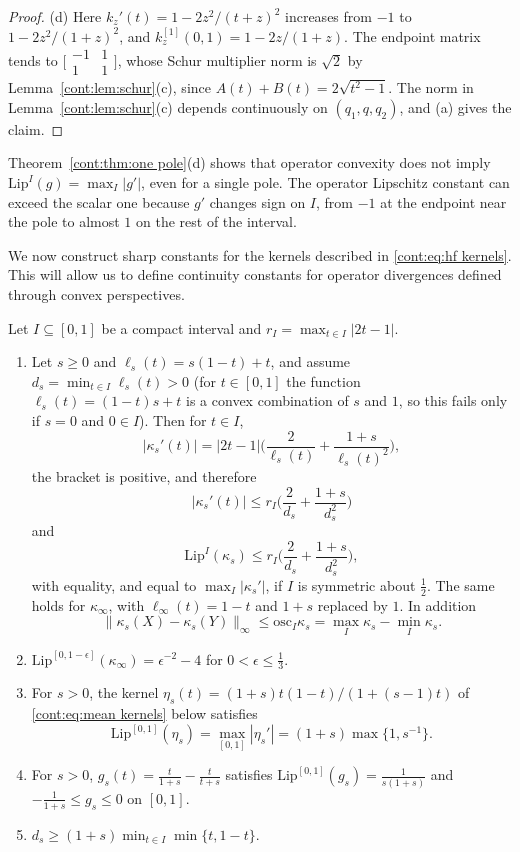 \begin{proof}
(d) Here $k_z'(t)=1-2z^2/(t+z)^2$ increases from $-1$ to $1-2z^2/(1+z)^2$, and $k_z^{[1]}(0,1)=1-2z/(1+z)$. The endpoint matrix tends to $\big[\begin{smallmatrix}-1&1\\1&1\end{smallmatrix}\big]$, whose Schur multiplier norm is $\sqrt2$ by Lemma~\ref{cont:lem:schur}(c), since $A(t)+B(t)=2\sqrt{t^2-1}$. The norm in Lemma~\ref{cont:lem:schur}(c) depends continuously on $(q_1,q,q_2)$, and (a) gives the claim.
\end{proof}
 
Theorem~\ref{cont:thm:one pole}(d) shows that operator convexity does not imply $\mathrm{Lip}^I(g)=\max_I|g'|$, even for a single pole. The operator Lipschitz constant can exceed the scalar one because $g'$ changes sign on $I$, from $-1$ at the endpoint near the pole to almost $1$ on the rest of the interval.

We now construct sharp constants for the kernels described in \eqref{cont:eq:hf kernels}. This will allow us to define continuity constants for operator divergences defined through convex perspectives. 
\begin{corollary}\label{cont:cor:kernels}
Let $I\subseteq[0,1]$ be a compact interval and $r_I=\max_{t\in I}|2t-1|$.
\begin{enumerate}
\item[(a)]
Let $s\ge0$ and $\ell_s(t)=s(1-t)+t$, and assume $d_s=\min_{t\in I}\ell_s(t)>0$
(for $t\in[0,1]$ the function $\ell_s(t)=(1-t)s+t$ is a convex combination of $s$ and $1$,
so this fails only if $s=0$ and $0\in I$). Then for $t\in I$,
\[
  |\kappa_s'(t)|=|2t-1|\Big(\frac{2}{\ell_s(t)}+\frac{1+s}{\ell_s(t)^2}\Big),
\]
the bracket is positive, and therefore
\[
  |\kappa_s'(t)|
  \leq r_I\Big(\frac{2}{d_s}+\frac{1+s}{d_s^2}\Big)
\] and
\[
\mathrm{Lip}^I(\kappa_s)\leq r_I\Big(\frac{2}{d_s}+\frac{1+s}{d_s^2}\Big),
\]
with equality, and equal to $\max_I|\kappa_s'|$, if $I$ is symmetric about $\frac12$. The same holds for $\kappa_\infty$, with $\ell_\infty(t)=1-t$ and $1+s$ replaced by $1$. In addition
\[
\|\kappa_s(X)-\kappa_s(Y)\|_\infty\leq\mathrm{osc}_I\kappa_s=\max_I\kappa_s-\min_I\kappa_s.
\]
\item[(b)] $\mathrm{Lip}^{[0,1-\epsilon]}(\kappa_\infty)=\epsilon^{-2}-4$ for $0<\epsilon\leq\frac13$.
\item[(c)] For $s>0$, the kernel $\eta_s(t)=(1+s)t(1-t)/(1+(s-1)t)$ of \eqref{cont:eq:mean kernels} below satisfies
\[
\mathrm{Lip}^{[0,1]}(\eta_s)=\max_{[0,1]}|\eta_s'|=(1+s)\max\{1,s^{-1}\}.
\]
\item[(d)] For $s>0$, $g_s(t)=\frac{t}{1+s}-\frac{t}{t+s}$ satisfies $\mathrm{Lip}^{[0,1]}(g_s)=\frac{1}{s(1+s)}$ and $-\frac{1}{1+s}\leq g_s\leq0$ on $[0,1]$.
\item[(e)] $d_s\geq(1+s)\min_{t\in I}\min\{t,1-t\}$.
\end{enumerate}
\end{corollary}
 
